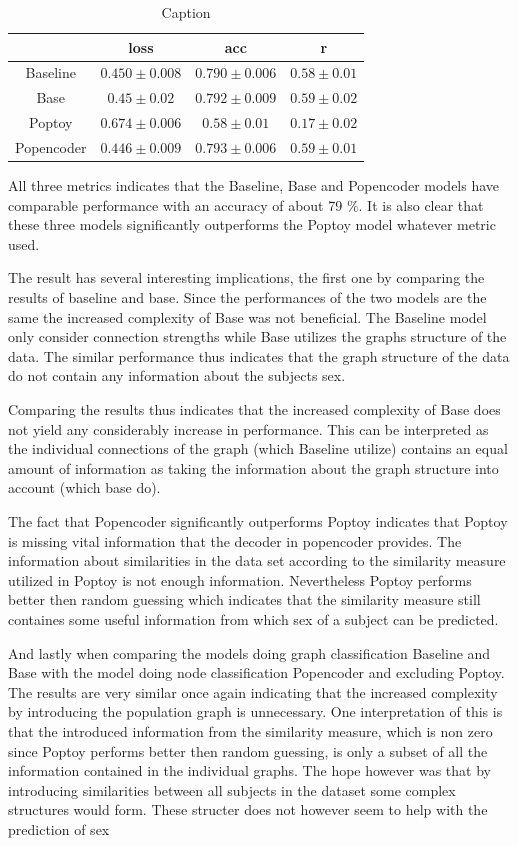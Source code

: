 \begin{table}[H]
    \centering
    \caption{Caption}
    \begin{tabular}{c|c|c|c}
         &  loss & acc & r\\ \hline
        Baseline & $0.450\pm0.008$ & $0.790\pm0.006$ &$0.58\pm 0.01$\\
        Base &$0.45\pm0.02$ & $0.792\pm0.009$& $0.59\pm0.02$\\
        Poptoy &$0.674\pm 0.006$ & $0.58\pm0.01$ &$0.17\pm0.02$\\
        Popencoder &$0.446\pm0.009$& $0.793\pm 0.006$ & $0.59\pm0.01$\\
    \end{tabular}
    \label{tab:sex_model_results}
\end{table}

All three metrics indicates that the Baseline, Base and Popencoder models have comparable performance with an accuracy of about 79 \%. It is also clear that these three models significantly outperforms the Poptoy model whatever metric used.

The result has several interesting implications, the first one by comparing the results of baseline and base. Since the performances of the two models are the same the increased complexity of Base was not beneficial. The Baseline model only consider connection strengths while Base utilizes the graphs structure of the data. The similar performance thus indicates that the graph structure of the data do not contain any information about the subjects sex. 

Comparing the results thus indicates that the increased complexity of Base does not yield any considerably increase in performance. This can be interpreted as the individual connections of the graph (which Baseline utilize) contains an equal amount of information as taking the information about the graph structure into account (which base do). 

The fact that Popencoder significantly outperforms Poptoy indicates that Poptoy is missing vital information that the decoder in popencoder provides. The information about similarities in the data set according to the similarity measure utilized in Poptoy is not enough information. Nevertheless Poptoy performs better then random guessing which indicates that the similarity measure still containes some useful information from which sex 
of a subject can be predicted. 

And lastly when comparing the models doing graph classification Baseline and Base with the model doing node classification Popencoder and excluding Poptoy. The results are very similar once again indicating that the increased complexity by introducing the population graph is unnecessary. One interpretation of this is that the introduced information from the similarity measure, which is non zero since Poptoy performs better then random guessing, is only a subset of all the information contained in the individual graphs. The hope however was that by introducing  similarities between all subjects in the dataset some complex structures would form. These structer does not however seem to help with the prediction of sex



